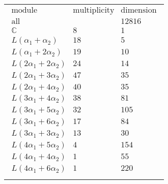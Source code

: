 \documentclass[crop,border=2mm]{standalone}
\begin{document}
\begin{tabular}{l}
$\displaystyle
\begin{array}{rll}
	\text{module}&\text{multiplicity}&\text{dimension} \\ \hline \text{all}&&12816 \\
	\mathbb{C}&8&1\\
	L\left(\alpha_{1}+\alpha_{2}\right)&18&5\\
	L\left(\alpha_{1}+ 2\alpha_{2}\right)&19&10\\
	L\left( 2\alpha_{1}+ 2\alpha_{2}\right)&24&14\\
	L\left( 2\alpha_{1}+ 3\alpha_{2}\right)&47&35\\
	L\left( 2\alpha_{1}+ 4\alpha_{2}\right)&40&35\\
	L\left( 3\alpha_{1}+ 4\alpha_{2}\right)&38&81\\
	L\left( 3\alpha_{1}+ 5\alpha_{2}\right)&32&105\\
	L\left( 3\alpha_{1}+ 6\alpha_{2}\right)&17&84\\
	L\left( 3\alpha_{1}+ 3\alpha_{2}\right)&13&30\\
	L\left( 4\alpha_{1}+ 5\alpha_{2}\right)&4&154\\
	L\left( 4\alpha_{1}+ 4\alpha_{2}\right)&1&55\\
	L\left( 4\alpha_{1}+ 6\alpha_{2}\right)&1&220
\end{array}
$ \\ \\

\end{tabular}
\end{document}
